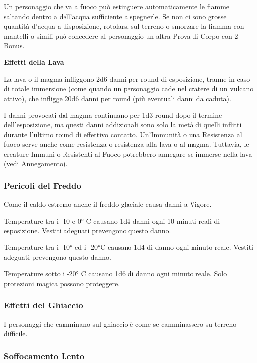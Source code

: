 \documentclass[12pt,a4paper,twoside,openany]{book}
\begin{document}
\begin{multicols}{2}
Un personaggio che va a fuoco può estinguere automaticamente le fiamme saltando dentro a dell'acqua sufficiente a spegnerle. Se non ci sono grosse quantità d'acqua a disposizione, rotolarsi sul terreno o smorzare la fiamma con mantelli o simili può concedere al personaggio un altra Prova di Corpo con 2 Bonus.

\textbf{Effetti della Lava}

La lava o il magma infliggono 2d6 danni per round di esposizione, tranne in caso di totale immersione (come quando un personaggio cade nel cratere di un vulcano attivo), che infligge 20d6 danni per round (più eventuali danni da caduta).

I danni provocati dal magma continuano per 1d3 round dopo il termine dell'esposizione, ma questi danni addizionali sono solo la metà di quelli inflitti durante l'ultimo round di effettivo contatto. Un'Immunità o una Resistenza al fuoco serve anche come resistenza o resistenza alla lava o al magma. Tuttavia, le creature Immuni o Resistenti al Fuoco potrebbero annegare se immerse nella lava (vedi Annegamento).


\subsubsection{Pericoli del Freddo}

\label{pericoli-del-freddo}

Come il caldo estremo anche il freddo glaciale causa danni a Vigore.

Temperature tra i -10 e 0° C causano 1d4 danni ogni 10 minuti reali di esposizione. Vestiti adeguati prevengono questo danno.

Temperature tra i -10° ed i -20°C causano 1d4 di danno ogni minuto reale.  Vestiti adeguati prevengono questo danno.

Temperature sotto i -20° C causano 1d6 di danno ogni minuto reale. Solo protezioni magica possono proteggere.

\subsubsection{Effetti del Ghiaccio}

I personaggi che camminano sul ghiaccio è come se camminassero su terreno difficile. 

\subsubsection{Soffocamento Lento}


\end{multicols}
\end{document}
